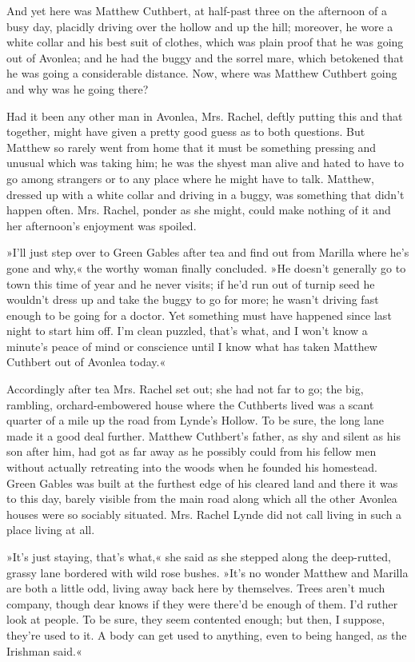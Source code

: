 And yet here was Matthew Cuthbert, at half-past three on the afternoon of a busy day, placidly driving over the hollow and up the hill; moreover, he wore a white collar and his best suit of clothes, which was plain proof that he was going out of Avonlea; and he had the buggy and the sorrel mare, which betokened that he was going a considerable distance. Now, where was Matthew Cuthbert going and why was he going there?

Had it been any other man in Avonlea, Mrs. Rachel, deftly putting this and that together, might have given a pretty good guess as to both questions. But Matthew so rarely went from home that it must be something pressing and unusual which was taking him; he was the shyest man alive and hated to have to go among strangers or to any place where he might have to talk. Matthew, dressed up with a white collar and driving in a buggy, was something that didn't happen often. Mrs. Rachel, ponder as she might, could make nothing of it and her afternoon's enjoyment was spoiled.

»I'll just step over to Green Gables after tea and find out from Marilla where he's gone and why,« the worthy woman finally concluded. »He doesn't generally go to town this time of year and he never visits; if he'd run out of turnip seed he wouldn't dress up and take the buggy to go for more; he wasn't driving fast enough to be going for a doctor. Yet something must have happened since last night to start him off. I'm clean puzzled, that's what, and I won't know a minute's peace of mind or conscience until I know what has taken Matthew Cuthbert out of Avonlea today.«

Accordingly after tea Mrs. Rachel set out; she had not far to go; the big, rambling, orchard-embowered house where the Cuthberts lived was a scant quarter of a mile up the road from Lynde's Hollow. To be sure, the long lane made it a good deal further. Matthew Cuthbert's father, as shy and silent as his son after him, had got as far away as he possibly could from his fellow men without actually retreating into the woods when he founded his homestead. Green Gables was built at the furthest edge of his cleared land and there it was to this day, barely visible from the main road along which all the other Avonlea houses were so sociably situated. Mrs. Rachel Lynde did not call living in such a place living at all.

»It's just staying, that's what,« she said as she stepped along the deep-rutted, grassy lane bordered with wild rose bushes. »It's no wonder Matthew and Marilla are both a little odd, living away back here by themselves. Trees aren't much company, though dear knows if they were there'd be enough of them. I'd ruther look at people. To be sure, they seem contented enough; but then, I suppose, they're used to it. A body can get used to anything, even to being hanged, as the Irishman said.«

